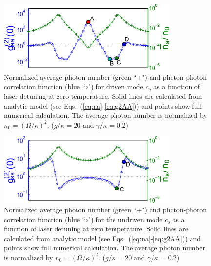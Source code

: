 \begin{figure}
\centering
  \includegraphics[width=0.8\textwidth]{./figs_Komar2013/fig2a.pdf}
  
  \caption{
  \label{fig:spectrum_a}
  Normalized average photon number (green ``$+$")
  and photon-photon correlation function (blue ``$\circ$")
  for driven mode $c_a$
  as a function of laser detuning at zero temperature.
  Solid lines are calculated from analytic model
  (see Eqs.~(\ref{eq:na}-\ref{eq:g2AA}))
  and points show full numerical calculation.
  The average photon number is
  normalized by $n_0 = (\Omega/\kappa)^2$. ($g/\kappa = 20$ and $\gamma/\kappa$
  = 0.2)
  }
\end{figure}

\begin{figure}
\centering
  \includegraphics[width=0.8\textwidth]{./figs_Komar2013/fig2b.pdf}
  \caption{
  \label{fig:spectrum_b}
  Normalized average photon number (green ``$+$")
  and photon-photon correlation function (blue ``$\circ$")
  for the undriven mode $c_s$
  as a function of laser detuning at zero temperature.
  Solid lines are calculated from analytic model
  (see Eqs.~(\ref{eq:na}-\ref{eq:g2AA}))
  and points show full numerical calculation.
  The average photon number is
  normalized by $n_0 = (\Omega/\kappa)^2$. ($g/\kappa = 20$ and $\gamma/\kappa$
  = 0.2)
  }
\end{figure}
 
